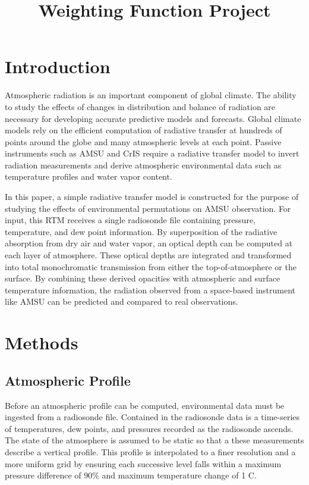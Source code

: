 \documentclass[twocol]{ametsoc}
\title{Weighting Function Project}
\affiliation{University of Wisconsin - Madison}
\begin{document}
\maketitle


%
\section{Introduction}

Atmospheric radiation is an important component of global climate.
The ability to study the effects of changes in distribution and balance of radiation are necessary for developing accurate predictive models and forecasts.
Global climate models rely on the efficient computation of radiative transfer at hundreds of points around the globe and many atmospheric levels at each point.
Passive instruments such as AMSU and CrIS require a radiative transfer model to invert radiation measurements and derive atmospheric environmental data such as temperature profiles and water vapor content.
\par In this paper, a simple radiative transfer model is constructed for the purpose of studying the effects of environmental permutations on AMSU observation.
For input, this RTM receives a  single radiosonde file containing pressure, temperature, and dew point information.
By superposition of the radiative absorption from dry air and water vapor, an optical depth can be computed at each layer of atmosphere.
These optical depths are integrated and transformed into total monochromatic transmission from either the top-of-atmosphere or the surface.
By combining these derived opacities with atmospheric and surface temperature information, the radiation observed from a space-based instrument like AMSU can be predicted and compared to real observations.

\section{Methods}

\subsection{Atmospheric Profile}

Before an atmospheric profile can be computed, environmental data must be ingested from a radiosonde file.
Contained in the radiosonde data is a time-series of temperatures, dew points, and pressures recorded as the radiosonde ascends. The state of the atmosphere is assumed to be static so that a these measurements describe a vertical profile. This profile is interpolated to a finer resolution and a more uniform grid by ensuring each successive level falls within a maximum pressure difference of 90\% and maximum temperature change of 1 \degree{}C.
\end{document}
